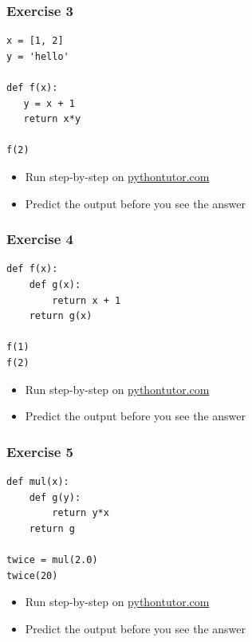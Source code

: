 \documentclass[14pt,compress,aspectratio=169]{beamer}
\begin{document}
\begin{frame}[fragile]
  \frametitle{Exercise 3}
\begin{lstlisting}
x = [1, 2]
y = 'hello'

def f(x):
   y = x + 1
   return x*y

f(2)
\end{lstlisting}
\vspace*{0.1in}
  \begin{itemize}
  \item Run step-by-step on \url{pythontutor.com}
  \item Predict the output before you see the answer
  \end{itemize}

\end{frame}

\begin{frame}[fragile]
  \frametitle{Exercise 4}
\begin{lstlisting}
def f(x):
    def g(x):
        return x + 1
    return g(x)

f(1)
f(2)
\end{lstlisting}
\vspace*{0.1in}
  \begin{itemize}
  \item Run step-by-step on \url{pythontutor.com}
  \item Predict the output before you see the answer
  \end{itemize}

\end{frame}

\begin{frame}[fragile]
  \frametitle{Exercise 5}
\begin{lstlisting}
def mul(x):
    def g(y):
        return y*x
    return g

twice = mul(2.0)
twice(20)
\end{lstlisting}
\vspace*{0.1in}
  \begin{itemize}
  \item Run step-by-step on \url{pythontutor.com}
  \item Predict the output before you see the answer
  \end{itemize}

\end{frame}
\end{document}

